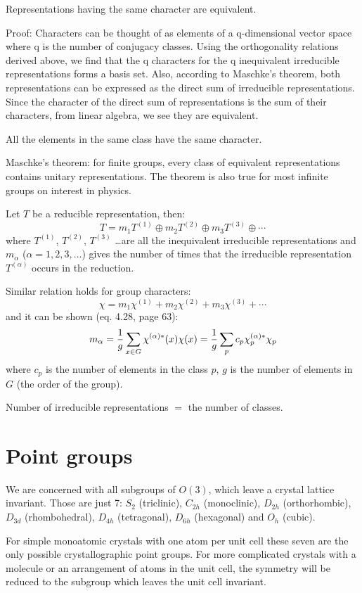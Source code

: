 Representations having the same character are equivalent.

Proof: Characters can be thought of as elements of a q-dimensional vector space
where q is the number of conjugacy classes. Using the orthogonality relations
derived above, we find that the q characters for the q inequivalent irreducible
representations forms a basis set. Also, according to Maschke's theorem, both
representations can be expressed as the direct sum of irreducible
representations. Since the character of the direct sum of representations is
the sum of their characters, from linear algebra, we see they are equivalent.

All the elements in the same class have the same character.

Maschke's theorem: for finite groups, every class of equivalent representations
contains unitary representations. The theorem is also true for most infinite
groups on interest in physics.

Let $T$ be a reducible representation, then:
$$T=m_1T^{(1)} \oplus m_2T^{(2)} \oplus m_3T^{(3)}\oplus \cdots$$
where $T^{(1)}$, $T^{(2)}$, $T^{(3)}$ \dots are all the inequivalent irreducible
representations and $m_\alpha$ ($\alpha=1,2,3,\dots$) gives the number of times
that the irreducible representation $T^{(\alpha)}$ occurs in the reduction.

Similar relation holds for group characters:
$$\chi=m_1\chi^{(1)} + m_2\chi^{(2)} + m_3\chi^{(3)} + \cdots$$
and it can be shown \cite{elliott} (eq. 4.28, page 63):
$$m_\alpha={1\over g}\sum_{x\in G} \chi^{(\alpha)*}(x)\chi(x)=
{1\over g}\sum_{p} c_p\chi^{(\alpha)*}_p\chi_p$$
where $c_p$ is the number of elements in the class $p$, $g$ is the number of
elements in $G$ (the order of the group).

Number of irreducible representations $=$ the number of classes.


\section{Point groups}

We are concerned with all subgroups of $O(3)$, which leave a crystal lattice
invariant. Those are just 7: $S_2$ (triclinic), $C_{2h}$ (monoclinic), $D_{2h}$
(orthorhombic), $D_{3d}$ (rhombohedral), $D_{4h}$ (tetragonal), $D_{6h}$
(hexagonal) and $O_{h}$ (cubic).

For simple monoatomic crystals with one atom per unit cell these seven are the
only possible crystallographic point groups. For more complicated crystals with
a molecule or an arrangement of atoms in the unit cell, the symmetry will be
reduced to the subgroup which leaves the unit cell invariant.

